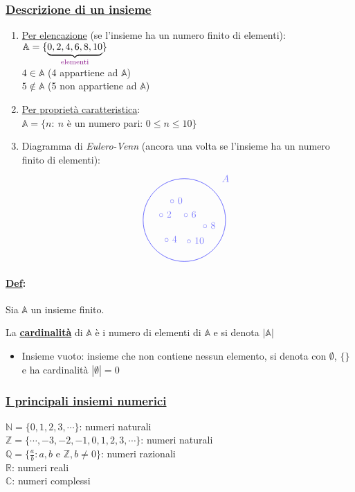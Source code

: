 \documentclass{article}
\newcommand{\ul}[1]{\underline{#1}}
\newcommand{\A}{\mathbb{A}}
\newcommand{\R}{\mathbb{R}}
\newcommand{\Def}[2]{\paragraph{\ul{Def}:}#1\\\hspace*{3em}\begin{minipage}{.8\textwidth}#2\end{minipage}}
\newcommand{\colort}[2]{\text{\color{#1}#2}}
\begin{document}
\subsubsection*{\color{green}\ul{Descrizione di un insieme}}
\begin{enumerate}
	\item \ul{Per elencazione} (se l'insieme ha un numero finito di elementi):\\
	  $\A=\{\underbrace{0,2,4,6,8,10}_{\colort{violet}{elementi}}\}$\\
	  $4\in\A$ (4 appartiene ad $\A$)\\
	  $5\notin\A$ (5 non appartiene ad $\A$)
	\item \ul{Per proprietà caratteristica}:\\
	  $\A=\{n:\ n$ è un numero pari: $0\le n\le 10\}$
	\item Diagramma di \textit{Eulero-Venn} (ancora una volta se l'insieme ha un numero finito di elementi):\\
	  \begin{displaymath}
		  \begin{tikzpicture}
			  \begin{scope}[shift={(3cm,-5cm)}, fill opacity=0.5]
				  \draw[blue] (0,0) circle (1.5cm);
				  \draw[blue] (1.5,1.5) node {$A$};
				  \draw[blue] (-0.3,0.7) node {$\circ\ 0$};
				  \draw[blue] (-0.7,0.2) node {$\circ\ 2$};
				  \draw[blue] (-0.5,-0.7) node {$\circ\ 4$};
				  \draw[blue] (0.4,-0.75) node {$\circ\ 10$};
				  \draw[blue] (0.9,-0.2) node {$\circ\ 8$};
				  \draw[blue] (0.2,0.2) node {$\circ\ 6$};
			  \end{scope}
		  \end{tikzpicture}
	  \end{displaymath}
\end{enumerate}
\Def{Sia $\A$ un insieme finito.}{La \ul{\textbf{cardinalità}} di $\A$ è i numero di elementi di $\A$ e si denota $|\A|$\\
	\begin{itemize}
		\item Insieme vuoto: insieme che non contiene nessun elemento, si denota con $\emptyset$, $\{\}$ e ha cardinalità $|\emptyset|=0$
\end{itemize}}
\subsubsection*{\color{blue}\ul{I principali insiemi numerici}}
$\mathbb{N}=\{0,1,2,3,\cdots\}$: numeri naturali\\
$\mathbb{Z}=\{\cdots,-3,-2,-1,0,1,2,3,\cdots\}$: numeri naturali\\
$\mathbb{Q}=\{\frac{a}{b}:a,b$ e $\mathbb{Z},b\not=0\}$: numeri razionali\\
$\R$: numeri reali\\
$\mathbb{C}$: numeri complessi
\end{document}
